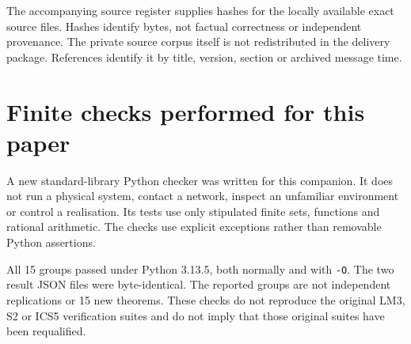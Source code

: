 The accompanying source register supplies hashes for the locally available exact source files. Hashes identify bytes, not factual correctness or independent provenance. The private source corpus itself is not redistributed in the delivery package. References identify it by title, version, section or archived message time.

\section{Finite checks performed for this paper}
\label{app:checks}

A new standard-library Python checker was written for this companion. It does not run a physical system, contact a network, inspect an unfamiliar environment or control a realisation. Its tests use only stipulated finite sets, functions and rational arithmetic. The checks use explicit exceptions rather than removable Python assertions.

All 15 groups passed under Python 3.13.5, both normally and with \texttt{-O}. The two result JSON files were byte-identical. The reported groups are not independent replications or 15 new theorems. These checks do not reproduce the original LM3, S2 or ICS5 verification suites and do not imply that those original suites have been requalified.

